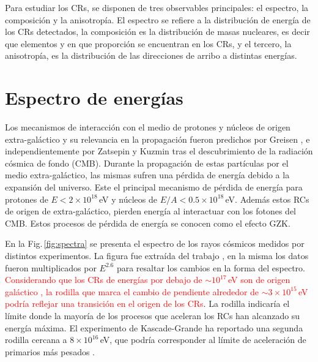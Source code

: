 Para estudiar los CRs, se disponen de tres observables principales: el espectro, la composición y la anisotropía. El espectro se refiere a la distribución de energía de los CRs detectados, la composición es la distribución de masas nucleares, es decir que elementos y en que proporción se encuentran en los CRs, y el tercero, la anisotropía, es la distribución de las direcciones de arribo a distintas energías.

\section{Espectro de energías}
Los mecanismos de interacción con el medio de protones y núcleos de origen extra-galáctico y su relevancia en la propagación fueron predichos por Greisen \cite{greisen1966end}, e independientemente por Zatsepin y Kuzmin \cite{zatsepin1966upper} tras el descubrimiento de la radiación cósmica de fondo (CMB). Durante la propagación  de estas  partículas por el medio extra-galáctico, las mismas sufren una pérdida de energía debido a la expansión del universo. Este el principal mecanismo de pérdida de energía para protones de $E < 2\times 10^{18}\,$eV y núcleos de $E/A < 0.5\times 10^{18}\,$eV. Además estos RCs de origen de extra-galáctico, pierden energía al interactuar con los fotones del  CMB.  Estos procesos de pérdida de energía se conocen como el efecto GZK.

En la Fig.\,\ref{fig:spectra} se presenta el espectro de los rayos cósmicos medidos por distintos experimentos. La figura fue extraída del trabajo \cite{PGD}, en la misma los datos fueron multiplicados por $E^{2.6}$ para resaltar los cambios en la forma del espectro. \textcolor{red}{Considerando que los CRs de energías por debajo de $\sim  10^{17}\,$eV son de origen galáctico \cite{taborda}, la rodilla que marca el cambio de pendiente alrededor de $\sim 3\times10^{15}\,$eV podría reflejar una transición en el origen de los CRs}. La rodilla indicaría el límite donde la mayoría de los procesos que aceleran los RCs han alcanzado su energía máxima. El experimento de Kascade-Grande ha reportado una segunda rodilla cercana a $8\times10^{16}\,$eV, que podría corresponder al límite de aceleración de primarios más pesados \cite{PGD}.

